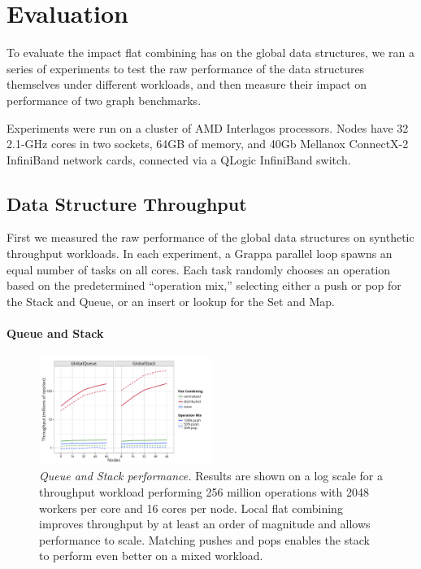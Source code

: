 \section{Evaluation}
To evaluate the impact flat combining has on the global data structures, we ran a series of experiments to test the raw performance of the data structures themselves under different workloads, and then measure their impact on performance of two graph benchmarks.

Experiments were run on a cluster of AMD Interlagos processors. Nodes have 32 2.1-GHz cores in two sockets, 64GB of memory, and 40Gb Mellanox ConnectX-2 InfiniBand network cards, connected via a QLogic InfiniBand switch.

\subsection{Data Structure Throughput}
First we measured the raw performance of the global data structures on synthetic throughput workloads. In each experiment, a Grappa parallel loop spawns an equal number of tasks on all cores. Each task randomly chooses an operation based on the predetermined ``operation mix,'' selecting either a push or pop for the Stack and Queue, or an insert or lookup for the Set and Map.

\paragraph{Queue and Stack}
\begin{figure}[t]
  \centering
  \includegraphics[width=0.5\textwidth]{data/plots/vector_perf.pdf}
  \caption{\emph{Queue and Stack performance.}
    Results are shown on a log scale for a throughput workload performing 256 million operations with 2048 workers per core and 16 cores per node. Local flat combining improves throughput by at least an order of magnitude and allows performance to scale. Matching pushes and pops enables the stack to perform even better on a mixed workload.
  }
  \label{fig:vector}
\end{figure}

